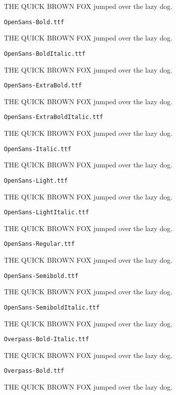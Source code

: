 \documentclass{article}
\begin{document}
THE QUICK BROWN FOX jumped over the lazy dog.

\setmainfont[Extension=.ttf]{OpenSans-Bold}
\noindent \verb!OpenSans-Bold.ttf!

THE QUICK BROWN FOX jumped over the lazy dog.

\setmainfont[Extension=.ttf]{OpenSans-BoldItalic}
\noindent \verb!OpenSans-BoldItalic.ttf!

THE QUICK BROWN FOX jumped over the lazy dog.

\setmainfont[Extension=.ttf]{OpenSans-ExtraBold}
\noindent \verb!OpenSans-ExtraBold.ttf!

THE QUICK BROWN FOX jumped over the lazy dog.

\setmainfont[Extension=.ttf]{OpenSans-ExtraBoldItalic}
\noindent \verb!OpenSans-ExtraBoldItalic.ttf!

THE QUICK BROWN FOX jumped over the lazy dog.

\setmainfont[Extension=.ttf]{OpenSans-Italic}
\noindent \verb!OpenSans-Italic.ttf!

THE QUICK BROWN FOX jumped over the lazy dog.

\setmainfont[Extension=.ttf]{OpenSans-Light}
\noindent \verb!OpenSans-Light.ttf!

THE QUICK BROWN FOX jumped over the lazy dog.

\setmainfont[Extension=.ttf]{OpenSans-LightItalic}
\noindent \verb!OpenSans-LightItalic.ttf!

THE QUICK BROWN FOX jumped over the lazy dog.

\setmainfont[Extension=.ttf]{OpenSans-Regular}
\noindent \verb!OpenSans-Regular.ttf!

THE QUICK BROWN FOX jumped over the lazy dog.

\setmainfont[Extension=.ttf]{OpenSans-Semibold}
\noindent \verb!OpenSans-Semibold.ttf!

THE QUICK BROWN FOX jumped over the lazy dog.

\setmainfont[Extension=.ttf]{OpenSans-SemiboldItalic}
\noindent \verb!OpenSans-SemiboldItalic.ttf!

THE QUICK BROWN FOX jumped over the lazy dog.

\setmainfont[Extension=.ttf]{Overpass-Bold-Italic}
\noindent \verb!Overpass-Bold-Italic.ttf!

THE QUICK BROWN FOX jumped over the lazy dog.

\setmainfont[Extension=.ttf]{Overpass-Bold}
\noindent \verb!Overpass-Bold.ttf!

THE QUICK BROWN FOX jumped over the lazy dog.
\end{document}
